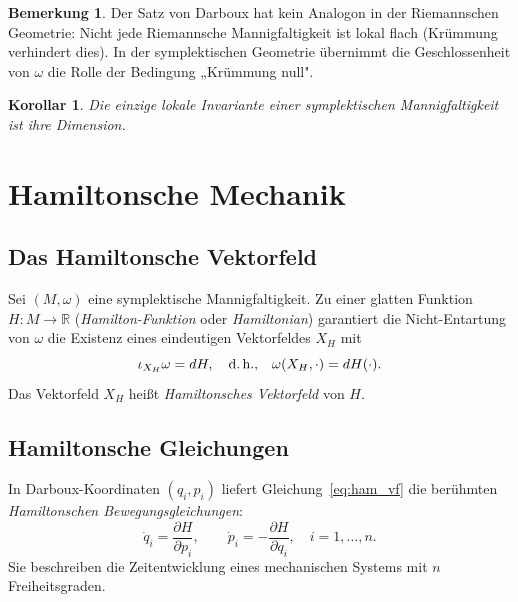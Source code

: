 \documentclass[12pt,a4paper]{amsart}
\newtheorem{korollar}[theorem]{Korollar}
\theoremstyle{definition}
\newtheorem{bemerkung}[theorem]{Bemerkung}
\begin{document}
\begin{bemerkung}
Der Satz von Darboux hat kein Analogon in der Riemannschen Geometrie: Nicht
jede Riemannsche Mannigfaltigkeit ist lokal flach (Krümmung verhindert dies).
In der symplektischen Geometrie übernimmt die Geschlossenheit von $\omega$
die Rolle der Bedingung „Krümmung null".
\end{bemerkung}

\begin{korollar}
Die einzige lokale Invariante einer symplektischen Mannigfaltigkeit ist ihre
Dimension.
\end{korollar}

\section{Hamiltonsche Mechanik}
\label{sec:hamilton}

\subsection{Das Hamiltonsche Vektorfeld}

Sei $(M, \omega)$ eine symplektische Mannigfaltigkeit.  Zu einer glatten
Funktion $H: M \to \mathbb{R}$ (\emph{Hamilton-Funktion} oder
\emph{Hamiltonian}) garantiert die Nicht-Entartung von $\omega$ die Existenz
eines eindeutigen Vektorfeldes $X_H$ mit
\begin{equation}\label{eq:ham_vf}
  \iota_{X_H}\omega = dH, \quad \text{d.\,h.,} \quad
  \omega(X_H, \cdot) = dH(\cdot).
\end{equation}
Das Vektorfeld $X_H$ heißt \emph{Hamiltonsches Vektorfeld} von $H$.

\subsection{Hamiltonsche Gleichungen}

In Darboux-Koordinaten $(q_i, p_i)$ liefert Gleichung~\eqref{eq:ham_vf} die
berühmten \emph{Hamiltonschen Bewegungsgleichungen}:
\begin{equation}\label{eq:hamilton}
  \dot{q}_i = \frac{\partial H}{\partial p_i}, \qquad
  \dot{p}_i = -\frac{\partial H}{\partial q_i}, \quad i = 1, \ldots, n.
\end{equation}
Sie beschreiben die Zeitentwicklung eines mechanischen Systems mit $n$
Freiheitsgraden.
\end{document}
